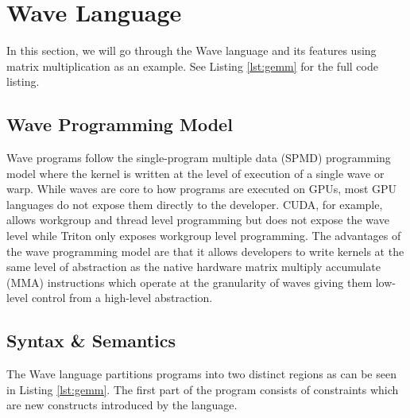 \documentclass{article}
\begin{document}
\section{Wave Language}
In this section, we will go through the Wave language and its features using matrix multiplication as an example. See Listing \ref{lst:gemm} for the full code listing.

\label{section:wave_language}
\subsection{Wave Programming Model}
Wave programs follow the single-program multiple data (SPMD) programming model where the kernel is written
at the level of execution of a single wave or warp. While waves are core to how programs are executed on
GPUs, most GPU languages do not expose them directly to the developer. CUDA, for example, allows workgroup
and thread level programming but does not expose the wave level while Triton only exposes workgroup level programming.
The advantages of the wave programming model are that it allows developers to write kernels at the same level of
abstraction as the native hardware matrix multiply accumulate (MMA) instructions which operate at the granularity of waves
giving them low-level control from a high-level abstraction.

\subsection{Syntax \& Semantics}
The Wave language partitions programs into two distinct regions as can be seen in Listing \ref{lst:gemm}.
The first part of the program consists of constraints which are new constructs introduced by the language.
\end{document}

